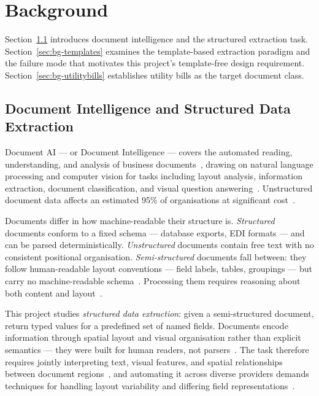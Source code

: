 \chapter{Background}
\label{chap:background}
 
Section~\ref{sec:bg-docai} introduces document intelligence and the
structured extraction task.
Section~\ref{sec:bg-templates} examines the template-based extraction
paradigm and the failure mode that motivates this project's
template-free design requirement.
Section~\ref{sec:bg-utilitybills} establishes utility bills as the
target document class.
 
\section{Document Intelligence and Structured Data Extraction}
\label{sec:bg-docai}
 
Document AI --- or Document Intelligence --- covers the automated
reading, understanding, and analysis of business
documents~\cite{Cui2021DocumentAI}, drawing on natural language
processing and computer vision for tasks including layout analysis,
information extraction, document classification, and visual question
answering~\cite{Cui2021DocumentAI}.
Unstructured document data affects an estimated 95\% of organisations
at significant cost~\cite{Baviskar2021Automated}.
 
Documents differ in how machine-readable their structure is.
\textit{Structured} documents conform to a fixed schema --- database
exports, EDI formats --- and can be parsed deterministically.
\textit{Unstructured} documents contain free text with no consistent
positional organisation.
\textit{Semi-structured} documents fall between: they follow
human-readable layout conventions --- field labels, tables, groupings
--- but carry no machine-readable schema~\cite{Hamdi2021InvoiceIE}.
Processing them requires reasoning about both content and
layout~\cite{Nandi2024VDU}.
 
This project studies \textit{structured data extraction}: given a
semi-structured document, return typed values for a predefined set of
named fields.
Documents encode information through spatial layout and visual
organisation rather than explicit semantics --- they were built for
human readers, not parsers~\cite{Holt2018Invoices}.
The task therefore requires jointly interpreting text, visual features,
and spatial relationships between document
regions~\cite{Nandi2024VDU}, and automating it across diverse providers
demands techniques for handling layout variability and differing field
representations~\cite{Saout2024Invoice}.
 
